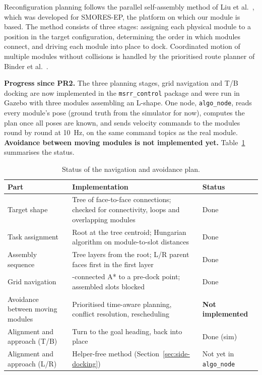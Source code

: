 \documentclass[12pt,a4paper]{article}
\begin{document}
Reconfiguration planning follows the parallel self-assembly method of Liu et al.\ \cite{liu2023}, which was developed for SMORES-EP, the platform on which our module is based. The method consists of three stages: assigning each physical module to a position in the target configuration, determining the order in which modules connect, and driving each module into place to dock. Coordinated motion of multiple modules without collisions is handled by the prioritised route planner of Binder et al.\ \cite{binder2019,binder2017}.

\textbf{Progress since PR2.} The three planning stages, grid navigation and T/B docking are now implemented in the \texttt{msrr\_control} package and were run in Gazebo with three modules assembling an L-shape. One node, \texttt{algo\_node}, reads every module's pose (ground truth from the simulator for now), computes the plan once all poses are known, and sends velocity commands to the modules round by round at \SI{10}{Hz}, on the same command topics as the real module. \textbf{Avoidance between moving modules is not implemented yet.} Table~\ref{tab:nav-status} summarises the status.

\begin{table}[H]
\centering\small
\caption{Status of the navigation and avoidance plan.}
\label{tab:nav-status}
\begin{tabularx}{\linewidth}{@{}>{\raggedright\arraybackslash}p{3.4cm} >{\raggedright\arraybackslash}X >{\raggedright\arraybackslash}p{2.5cm}@{}}
\toprule
\textbf{Part} & \textbf{Implementation} & \textbf{Status} \\
\midrule
Target shape & Tree of face-to-face connections; checked for connectivity, loops and overlapping modules & Done \\
Task assignment & Root at the tree centroid; Hungarian algorithm on module-to-slot distances & Done \\
Assembly sequence & Tree layers from the root; L/R parent faces first in the first layer & Done \\
Grid navigation & 4-connected A* to a pre-dock point; assembled slots blocked & Done \\
Avoidance between moving modules & Prioritised time-aware planning, conflict resolution, rescheduling & \textbf{Not implemented} \\
Alignment and approach (T/B) & Turn to the goal heading, back into place & Done (sim) \\
Alignment and approach (L/R) & Helper-free method (Section~\ref{sec:side-docking}) & Not yet in \texttt{algo\_node} \\
\bottomrule
\end{tabularx}
\end{table}
\end{document}
